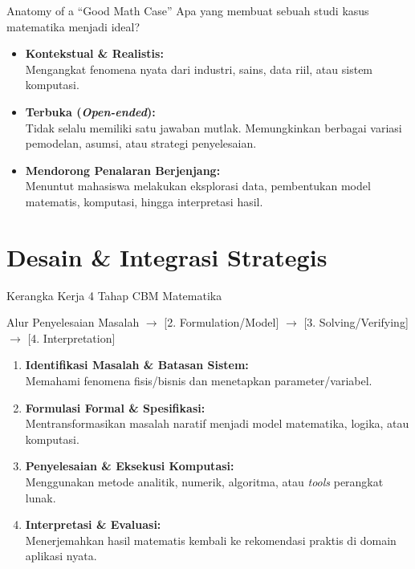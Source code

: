 \documentclass[aspectratio=169]{beamer} %
\begin{document}
\begin{frame}{Anatomy of a ``Good Math Case''}
    Apa yang membuat sebuah studi kasus matematika menjadi ideal?
    \vspace{0.3cm}
    \begin{itemize}
        \item \textbf{Kontekstual \& Realistis:}\\ Mengangkat fenomena nyata dari industri, sains, data riil, atau sistem komputasi.
        \vspace{0.2cm}
        \item \textbf{Terbuka (\textit{Open-ended}):}\\ Tidak selalu memiliki satu jawaban mutlak. Memungkinkan berbagai variasi pemodelan, asumsi, atau strategi penyelesaian.
        \vspace{0.2cm}
        \item \textbf{Mendorong Penalaran Berjenjang:}\\ Menuntut mahasiswa melakukan eksplorasi data, pembentukan model matematis, komputasi, hingga interpretasi hasil.
    \end{itemize}
\end{frame}

\section{Desain \& Integrasi Strategis}

\begin{frame}{Kerangka Kerja 4 Tahap CBM Matematika}
    \begin{block}{Alur Penyelesaian Masalah}
         $\rightarrow$ [2. Formulation/Model] $\rightarrow$ [3. Solving/Verifying] $\rightarrow$ [4. Interpretation]
    \end{block}
    \vspace{0.3cm}
    \begin{enumerate}
        \item \textbf{Identifikasi Masalah \& Batasan Sistem:}\\ Memahami fenomena fisis/bisnis dan menetapkan parameter/variabel.
        \item \textbf{Formulasi Formal \& Spesifikasi:}\\ Mentransformasikan masalah naratif menjadi model matematika, logika, atau komputasi.
        \item \textbf{Penyelesaian \& Eksekusi Komputasi:}\\ Menggunakan metode analitik, numerik, algoritma, atau \textit{tools} perangkat lunak.
        \item \textbf{Interpretasi \& Evaluasi:}\\ Menerjemahkan hasil matematis kembali ke rekomendasi praktis di domain aplikasi nyata.
    \end{enumerate}
\end{frame}
\end{document}
